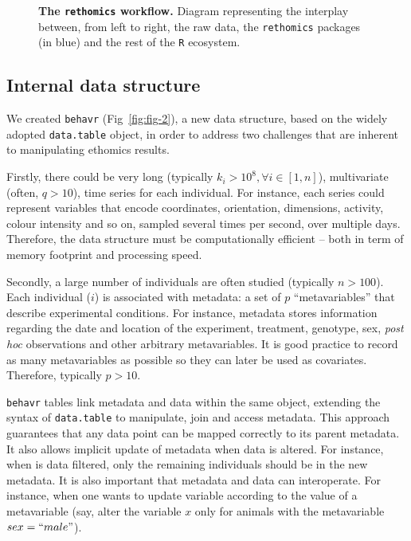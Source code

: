 \documentclass[10pt,letterpaper]{article}\usepackage[]{graphicx}\usepackage[]{color}
\begin{document}
\begin{figure}[!h]
	\caption{{\bf The \texttt{rethomics} workflow.}
		Diagram representing the interplay between, from left to right, the raw data, the \texttt{rethomics} packages (in blue) and the rest of the \texttt{R} ecosystem.}
	\label{fig:fig-1}
\end{figure}


\subsection*{Internal data structure}
We created \texttt{behavr} (Fig~\ref{fig:fig-2}), a new data structure, based on the widely adopted \texttt{data.table} object, in order to address 
two challenges that are inherent to manipulating ethomics results.

Firstly, there could be very long (typically $k_i > 10^8, \forall i \in [1,n]$), multivariate (often, $q > 10$), time series for each individual.
For instance, each series could represent variables that encode coordinates, orientation, dimensions, activity, colour intensity and so on, sampled several times per second, over multiple days.
Therefore, the data structure must be computationally efficient -- both in term of memory footprint and processing speed. 

Secondly, a large number of individuals are often studied (typically $n > 100$).
Each individual ($i$) is associated with metadata: a set of $p$ ``metavariables'' that describe experimental conditions.
For instance, metadata stores information regarding the date and location of the experiment, treatment, genotype, sex, \emph{post hoc} observations and other arbitrary metavariables.
It is good practice to record as many metavariables as possible so they can later be used as covariates. 
Therefore, typically $p > 10$.

\texttt{behavr} tables link metadata and data within the same object, extending the syntax of \texttt{data.table} to manipulate, join and access metadata.
This approach guarantees that any data point can be mapped correctly to its parent metadata.
It also allows implicit update of metadata when data is altered.
For instance, when is data filtered, only the remaining individuals should be in the new metadata. 
It is also important that metadata and data can interoperate.
For instance, when one wants to update variable according to the value of a metavariable (say, alter the variable $x$ only for animals with the metavariable $sex=``male"$).
\end{document}
